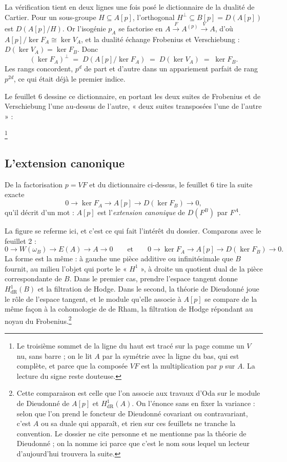 \documentclass[11pt,a4paper]{article}
\begin{document}
La vérification tient en deux lignes une fois posé le dictionnaire de la
dualité de Cartier. Pour un sous-groupe $H \subseteq A[p]$, l'orthogonal
$H^{\perp} \subseteq B[p] = D(A[p])$ est $D(A[p]/H)$. Or l'isogénie $p_A$ se
factorise en $A \xrightarrow{\;F\;} A^{(p)} \xrightarrow{\;V\;} A$, d'où
$A[p]/\ker F_A \cong \ker V_A$, et la dualité échange Frobenius et
Verschiebung : $D(\ker V_A) = \ker F_B$. Donc
\[
  (\ker F_A)^{\perp} \;=\; D\!\left(A[p]/\ker F_A\right) \;=\; D(\ker V_A)
  \;=\; \ker F_B .
\]
Les rangs concordent, $p^d$ de part et d'autre dans un appariement parfait de
rang $p^{2d}$, ce qui était déjà le premier indice.

Le feuillet 6 dessine ce dictionnaire, en portant les deux suites de
Frobenius et de Verschiebung l'une au-dessus de l'autre, « deux suites
transposées l'une de l'autre » :


\footnote{Le troisième sommet de la ligne du haut est tracé sur la page comme
un $V$ nu, sans barre ; on le lit $A$ par la symétrie avec la ligne du bas, qui
est complète, et parce que la composée $VF$ est la multiplication par $p$ sur
$A$. La lecture du signe reste douteuse.}

\subsection*{L'extension canonique}

De la factorisation $p = VF$ et du dictionnaire ci-dessus, le feuillet 6 tire
la suite exacte
\[
  0 \longrightarrow \ker F_A \longrightarrow A[p] \longrightarrow
    D(\ker F_B) \longrightarrow 0 ,
\]
qu'il décrit d'un mot : $A[p]$ est l'\emph{extension canonique} de $D(F^B)$ par
$F^A$.

La figure se referme ici, et c'est ce qui fait l'intérêt du dossier.
Comparons avec le feuillet 2 :
\[
  0 \to W(\omega_B) \to E(A) \to A \to 0
  \qquad\text{et}\qquad
  0 \to \ker F_A \to A[p] \to D(\ker F_B) \to 0 .
\]
La forme est la même : à gauche une pièce additive ou infinitésimale que $B$ fournit, au
milieu l'objet qui porte le « $H^1$ », à droite un quotient dual de la pièce
correspondante de $B$. Dans le premier cas, prendre l'espace tangent donne
$H^1_{\mathrm{dR}}(B)$ et la filtration de Hodge. Dans le second, la théorie de
Dieudonné joue le rôle de l'espace tangent, et le module qu'elle associe à
$A[p]$ se compare de la même façon à la cohomologie de de Rham, la filtration
de Hodge répondant au noyau du Frobenius.\footnote{Cette comparaison est celle
que l'on associe aux travaux d'Oda sur le module de Dieudonné de $A[p]$ et
$H^1_{\mathrm{dR}}(A)$. On l'énonce sans en fixer la variance : selon que l'on
prend le foncteur de Dieudonné covariant ou contravariant, c'est $A$ ou sa
duale qui apparaît, et rien sur ces feuillets ne tranche la convention. Le
dossier ne cite personne et ne mentionne pas la théorie de Dieudonné ; on la
nomme ici parce que c'est le nom sous lequel un lecteur d'aujourd'hui trouvera
la suite.}
\end{document}
